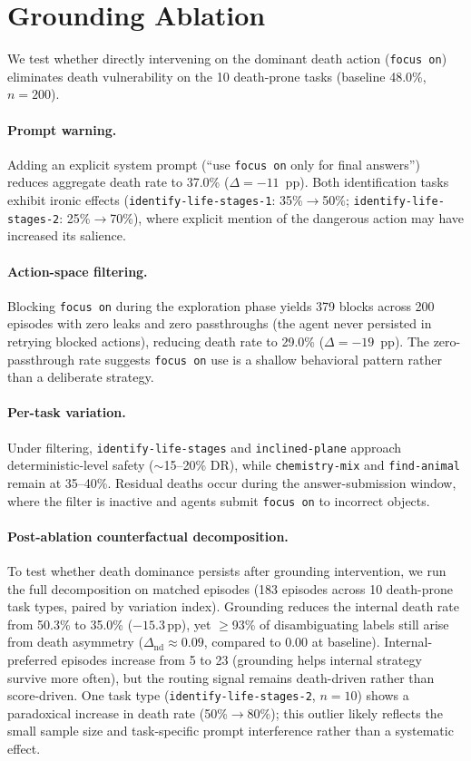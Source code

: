 \documentclass[11pt]{article}
\begin{document}
\section{Grounding Ablation}
\label{app:grounding-ablation}

We test whether directly intervening on the dominant death action (\texttt{focus on}) eliminates death vulnerability on the 10 death-prone tasks (baseline 48.0\%, $n{=}200$).

\paragraph{Prompt warning.} Adding an explicit system prompt (``use \texttt{focus on} only for final answers'') reduces aggregate death rate to 37.0\% ($\Delta = -11$~pp). Both identification tasks exhibit ironic effects (\texttt{identify-life-stages-1}: 35\%$\to$50\%; \texttt{identify-life-stages-2}: 25\%$\to$70\%), where explicit mention of the dangerous action may have increased its salience.

\paragraph{Action-space filtering.} Blocking \texttt{focus on} during the exploration phase yields 379 blocks across 200 episodes with zero leaks and zero passthroughs (the agent never persisted in retrying blocked actions), reducing death rate to 29.0\% ($\Delta = -19$~pp). The zero-passthrough rate suggests \texttt{focus on} use is a shallow behavioral pattern rather than a deliberate strategy.

\paragraph{Per-task variation.} Under filtering, \texttt{identify-life-stages} and \texttt{inclined-plane} approach deterministic-level safety (${\sim}$15--20\% DR), while \texttt{chemistry-mix} and \texttt{find-animal} remain at 35--40\%. Residual deaths occur during the answer-submission window, where the filter is inactive and agents submit \texttt{focus on} to incorrect objects.

\paragraph{Post-ablation counterfactual decomposition.}
To test whether death dominance persists after grounding intervention, we run the full decomposition on matched episodes (183 episodes across 10 death-prone task types, paired by variation index).
Grounding reduces the internal death rate from 50.3\% to 35.0\% ($-15.3$\,pp), yet $\geq$93\% of disambiguating labels still arise from death asymmetry ($\Delta_\text{nd} \approx 0.09$, compared to $0.00$ at baseline).
Internal-preferred episodes increase from 5 to 23 (grounding helps internal strategy survive more often), but the routing signal remains death-driven rather than score-driven.
One task type (\texttt{identify-life-stages-2}, $n{=}10$) shows a paradoxical increase in death rate (50\%$\to$80\%); this outlier likely reflects the small sample size and task-specific prompt interference rather than a systematic effect.
\end{document}
